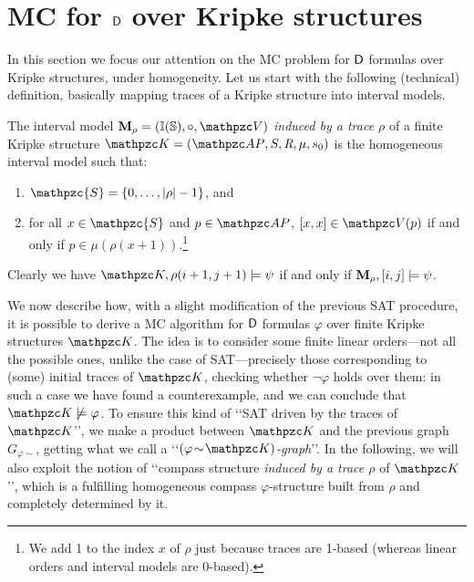 \section{MC for $\mathsf{D}${} over Kripke structures} \label{sec:mc}

In this section we focus our attention on the MC problem for $\mathsf{D}$ formulas over Kripke structures, under homogeneity.
%
Let us start with the following (technical) definition, basically mapping traces of a Kripke structure into interval models.
\begin{definition}\label{def:trimodel}%
The interval model
$\bM_\rho=(\mathbb{I(S)},\circ,\cV)$ \emph{induced by a trace $\rho$} of a finite Kripke structure $\Ku=\KuDef$
is the homogeneous interval model such that:
\begin{enumerate}
    \item $\mathpzc{S}=\{0,\ldots,|\rho|-1\}$, and
    \item for all $x\in \mathpzc{S}$ and $p\in\AP$, $[x,x]\in\cV(p)$ if and only if $p\in\mu(\rho(x+1))$.\footnote{We add 1 to the index $x$ of $\rho$ just because traces are 1-based (whereas linear orders and interval models are 0-based).}
\end{enumerate}
\end{definition}
%
Clearly we have $\Ku,\rho(i+1,j+1)\models \psi$ if and only if $\mathbf{M}_\rho,[i,j]\models \psi$.

We now describe how, with a slight modification of the previous SAT procedure, it is possible to derive a MC algorithm for $\mathsf{D}$ formulas $\varphi$ over finite Kripke structures $\Ku$.
The idea is to consider some finite linear orders---not all the possible ones, unlike the case of SAT---precisely those corresponding to (some) initial traces of $\Ku$, checking whether $\neg\varphi$ holds over them: 
in such a case we have found a counterexample, and we can conclude that $\Ku\not\models\varphi$.
To ensure this kind of \lq\lq SAT driven by the traces of $\Ku$\rq\rq, we make a product between $\Ku$ and the previous graph $G_{\varphi\sim}$, getting what we call a \lq\lq\emph{$(\varphi\!\sim\!\Ku)$-graph}\rq\rq. In the following, we will also exploit the notion of \lq\lq compass structure \emph{induced by a trace $\rho$} of $\Ku$\rq\rq, which is a fulfilling homogeneous compass $\varphi$-structure built from $\rho$ and completely determined by it.

